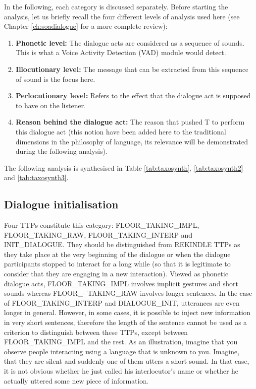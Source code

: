     In the following, each category is discussed separately. Before starting the analysis, let us briefly recall the four different levels of analysis used here (see Chapter \ref{ch:soadialogue} for a more complete review):
		
		\begin{enumerate}
			\item \textbf{Phonetic level:} The dialogue acts are considered as a sequence of sounds. This is what a Voice Activity Detection (VAD) module would detect.
			\item \textbf{Illocutionary level:} The message that can be extracted from this sequence of sound is the focus here.
			\item \textbf{Perlocutionary level:} Refers to the effect that the dialogue act is supposed to have on the listener.
			\item \textbf{Reason behind the dialogue act:} The reason that pushed T to perform this dialogue act (this notion have been added here to the traditional dimensions in the philosophy of language, its relevance will be demonstrated during the following analysis).
		\end{enumerate}

    The following analysis is synthesised in Table \ref{tab:taxosynth}, \ref{tab:taxosynth2} and \ref{tab:taxosynth3}.            

    \subsection{Dialogue initialisation}
    \label{tax:dialinit}
		
         Four TTPs constitute this category: FLOOR\_TAKING\_IMPL, FLOOR\_TAKING\_RAW, FLOOR\_TAKING\_INTERP and INIT\_DIALOGUE. They should be distinguished from REKINDLE TTPs as they take place at the very beginning of the dialogue or when the dialogue participants stopped to interact for a long while (so that it is legitimate to consider that they are engaging in a new interaction). Viewed as phonetic dialogue acts, FLOOR\_TAKING\_IMPL involves implicit gestures and short sounds whereas FLOOR\_- TAKING\_RAW involves longer sentences. In the case of FLOOR\_TAKING\_INTERP and DIALOGUE\_INIT, utterances are even longer in general. However, in some cases, it is possible to inject new information in very short sentences, therefore the length of the sentence cannot be used as a criterion to distinguish between these TTPs, except between FLOOR\_TAKING\_IMPL and the rest. As an illustration, imagine that you observe people interacting using a language that is unknown to you. Imagine, that they are silent and suddenly one of them utters a short sound. In that case, it is not obvious whether he just called his interlocutor's name or whether he actually uttered some new piece of information.
			
